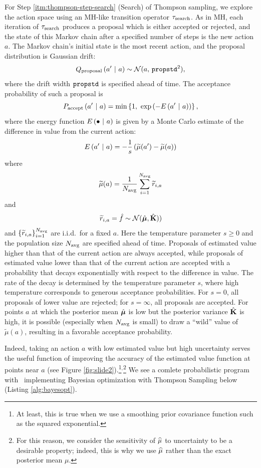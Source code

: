For Step \ref{itm:thompson-step-search} (Search) of Thompson sampling, we
explore the action space using an MH-like transition operator $\tau_{\textrm{search}}$.
As in MH, each iteration of $\tau_{\textrm{search}}$ produces a proposal which is either
accepted or rejected, and the state of this Markov chain after a specified
number of steps is the new action $a$.  The Markov chain's initial state is the
most recent action, and the proposal distribution is Gaussian drift:
\[ Q_{\textrm{proposal}}\left( a' \ \middle\vert\  a \right) \sim \mathcal{N}(a,\,\texttt{propstd}^2), \]
where the drift width $\texttt{propstd}$ is specified ahead of time.  The acceptance
probability of such a proposal is
\[ P_\accept\pn{a' \mvert a} = \min\br{1,\ \exp\pn{-E\pn{a' \mvert a}}}, \]
where the energy function $E\left( \bullet \ \middle\vert\  a \right)$ is given by a Monte Carlo
estimate of the difference in value from the current action:
\[ E\left( a' \ \middle\vert\  a \right) = -\frac1s \left( \widetilde{\mu}(a') - \widetilde{\mu}(a) \right) \]
where
\[ \widetilde{\mu}(a) = \frac{1}{N_{\textrm{avg}}} \sum_{i=1}^{N_{\textrm{avg}}} \widetilde{r}_{i,a} \]
and
\[ \widetilde{r}_{i,a}=\hat{f} \sim \mathcal{N}(\hat{\bm{\mu}}, \hat{\mathbf{K}})) \]
and $\left\{ \widetilde{r}_{i,a} \right\}_{i=1}^{N_{\textrm{avg}}}$ are i.i.d.\ for a fixed $a$.
Here the temperature parameter $s \geq 0$ and the population size $N_{\textrm{avg}}$ are
specified ahead of time.  Proposals of estimated value higher than that of the current action are
always accepted, while proposals of estimated value lower than that of the
current action are accepted with a probability that decays exponentially
with respect to the difference in value.
The rate of the decay is determined by the temperature parameter $s$,
where high temperature corresponds to generous acceptance probabilities.
For $s=0$, all proposals of lower value are rejected; for $s=\infty$, all
proposals are accepted.
For points $a$ at which the posterior mean $\hat{\bm{\mu}}$ is low but the
posterior variance $\hat{\mathbf{K}}$ is high, it is possible (especially when
$N_{\textrm{avg}}$ is small) to draw a ``wild'' value of $\widetilde{\mu}(a)$, resulting in a
favorable acceptance probability.



Indeed, taking an action $a$ with low estimated value but high uncertainty
serves the useful function of improving the accuracy of the estimated value
function at points near $a$ (see Figure \ref{fig:slide2}).\footnote{
  At least, this is true when we use a smoothing prior covariance function such
  as the squared exponential.
}$^,$\footnote{
  For this reason, we consider the sensitivity of $\widehat{\mu}$ to uncertainty to be
  a desirable property; indeed, this is why we use $\widehat{\mu}$ rather than the
  exact posterior mean $\mu$.
}
We see a comlete probabilistic program with \gpmem\ implementing Bayesian optimization
with Thompson Sampling below (Listing \ref{alg:bayesopt}).
 


